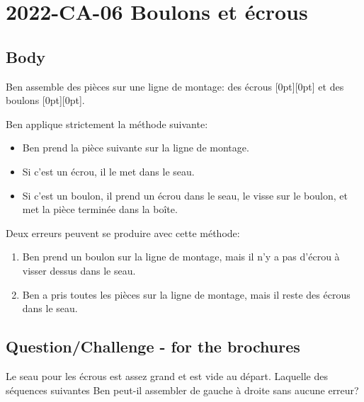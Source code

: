 \documentclass[a4paper,11pt]{report}
\newcommand{\taskGraphicsFolder}{..}
\begin{document}
\section*{\centering{} 2022-CA-06 Boulons et écrous}


\subsection*{Body}

Ben assemble des pièces sur une ligne de montage: des écrous \raisebox{-0.5ex}[0pt][0pt]{} et des boulons \raisebox{-0.5ex}[0pt][0pt]{}.

{\centering%
\par}

Ben applique strictement la méthode suivante:

\begin{itemize}
  \item Ben prend la pièce suivante sur la ligne de montage.
  \item Si c’est un écrou, il le met dans le seau.
  \item Si c’est un boulon, il prend un écrou dans le seau, le visse sur le boulon, et met la pièce terminée dans la boîte.
\end{itemize}

Deux erreurs peuvent se produire avec cette méthode:

\begin{enumerate}
  \item Ben prend un boulon sur la ligne de montage, mais il n’y a pas d’écrou à visser dessus dans le seau.
  \item Ben a pris toutes les pièces sur la ligne de montage, mais il reste des écrous dans le seau.
\end{enumerate}

{\em


\subsection*{Question/Challenge - for the brochures}

Le seau pour les écrous est assez grand et est vide au départ. Laquelle des séquences suivantes Ben peut-il assembler de gauche à droite sans aucune erreur?

}
\end{document}
